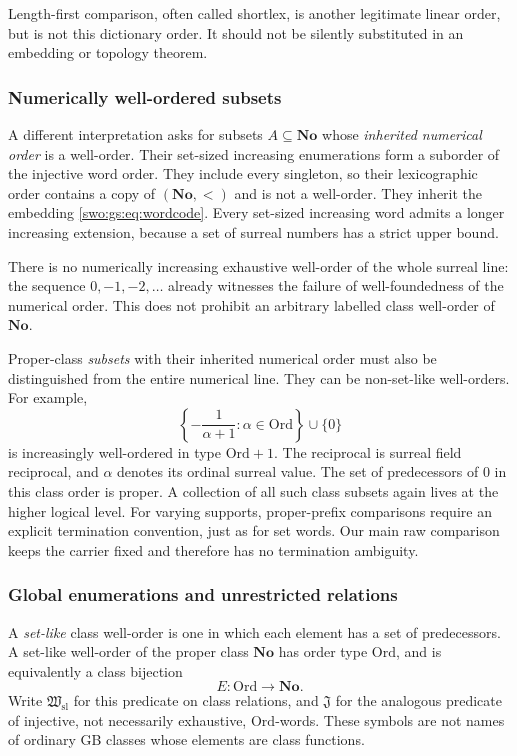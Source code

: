 \documentclass[11pt]{article}
\theoremstyle{definition}
\theoremstyle{remark}
\newcommand{\No}{\mathbf{No}}
\newcommand{\Ord}{\mathrm{Ord}}
\newcommand{\Hsl}{\mathfrak W_{\mathrm{sl}}}
\newcommand{\Jinj}{\mathfrak J}
\begin{document}
Length-first comparison, often called shortlex, is another legitimate
linear order, but is not this dictionary order. It should not be silently
substituted in an embedding or topology theorem.

\subsubsection{Numerically well-ordered subsets}
A different interpretation asks for subsets $A\subseteq\No$ whose
\emph{inherited numerical order} is a well-order. Their set-sized
increasing enumerations form a suborder of the injective word order.
They include every singleton, so their lexicographic order contains a copy
of $(\No,<)$ and is not a well-order. They inherit the embedding
\eqref{swo:gs:eq:wordcode}. Every set-sized increasing word admits a longer
increasing extension, because a set of surreal numbers has a strict upper
bound.

There is no numerically increasing exhaustive well-order of the whole
surreal line: the sequence $0,-1,-2,\ldots$ already witnesses the failure of
well-foundedness of the numerical order. This does not prohibit an
arbitrary labelled class well-order of $\No$.

Proper-class \emph{subsets} with their inherited numerical order must
also be distinguished from the entire numerical line. They can be
non-set-like well-orders. For example,
\[
 \left\{-\frac{1}{\alpha+1}:\alpha\in\Ord\right\}\cup\{0\}
\]
is increasingly well-ordered in type $\Ord+1$. The reciprocal is surreal
field reciprocal, and $\alpha$ denotes its ordinal surreal value. The
set of predecessors of $0$ in this class order is proper. A collection
of all such class subsets again lives at the higher logical level.
For varying supports, proper-prefix comparisons require an explicit
termination convention, just as for set words. Our main raw comparison
keeps the carrier fixed and therefore has no termination ambiguity.

\subsubsection{Global enumerations and unrestricted relations}
A \emph{set-like} class well-order is one in which each element has a set
of predecessors. A set-like well-order of the proper class $\No$ has order
type $\Ord$, and is equivalently a class bijection
\[
 E:\Ord\longrightarrow\No.
\]
Write $\Hsl$ for this predicate on class relations, and $\Jinj$ for the analogous
predicate of injective, not necessarily exhaustive, $\Ord$-words.
These symbols are not names of ordinary GB classes whose elements are
class functions.
\end{document}
